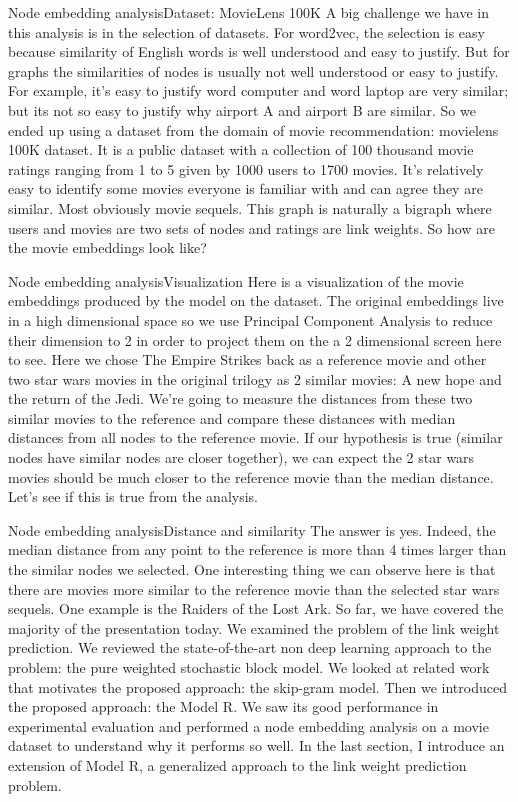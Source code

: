 \documentclass{beamer}
\begin{document}
\begin{frame}{Node embedding analysis}{Dataset: MovieLens 100K}
A big challenge we have in this analysis is in the selection of datasets.
For word2vec, the selection is easy because similarity of English words is well understood and easy to justify. But for graphs the similarities of nodes is usually not well understood or easy to justify. For example, it's easy to justify word computer and word laptop are very similar; but its not so easy to justify why airport A and airport B are similar. So we ended up using a dataset from the domain of movie recommendation: movielens 100K dataset. It is a public dataset with a collection of 100 thousand movie ratings ranging from 1 to 5 given by 1000 users to 1700 movies. It's relatively easy to identify some movies everyone is familiar with and can agree they are similar. Most obviously movie sequels. This graph is naturally a bigraph where users and movies are two sets of nodes and  ratings are link weights. So how are the movie embeddings look like?
\end{frame}

\begin{frame}{Node embedding analysis}{Visualization}
Here is a visualization of the movie embeddings produced by the model on the dataset. The original embeddings live in a high dimensional space so we use Principal Component Analysis to reduce their dimension to 2 in order to project them on the a 2 dimensional screen here to see. Here we chose The Empire Strikes back as a reference movie and other two star wars movies in the original trilogy as 2 similar movies: A new hope and the return of the Jedi. We're going to measure the distances from these two similar movies to the reference and compare these distances with median distances from all nodes to the reference movie. If our hypothesis is true (similar nodes have similar nodes are closer together), we can expect the 2 star wars movies should be much closer to the reference movie than the median distance. Let's see if this is true from the analysis.
\end{frame}

\begin{frame}{Node embedding analysis}{Distance and similarity}
The answer is yes. Indeed, the median distance from any point to the reference is more than 4 times larger than the similar nodes we selected. One interesting thing we can observe here is that there are movies more similar to the reference movie than the selected star wars sequels. One example is the Raiders of the Lost Ark. So far, we have covered the majority of the presentation today. We examined the problem of the link weight prediction. We reviewed the state-of-the-art non deep learning approach to the problem: the pure weighted stochastic block model. We looked at related work that motivates the proposed approach: the skip-gram model. Then we introduced the proposed approach: the Model R. We saw its good performance in experimental evaluation and performed a node embedding analysis on a movie dataset to understand why it performs so well. In the last section, I introduce an extension of Model R, a generalized approach to the link weight prediction problem.
\end{frame}
\end{document}

